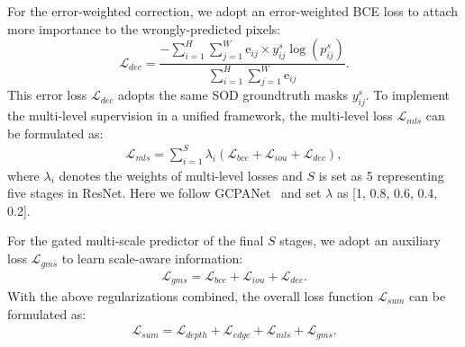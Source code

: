 \documentclass[journal]{IEEEtran}
\newcommand{\mc}[1]{\mathcal{#1}}
\newcommand{\br}[1]{\bm{\mathrm{#1}}}
\begin{document}
For the error-weighted correction, we adopt an error-weighted BCE loss to attach more importance to the wrongly-predicted pixels:
\begin{equation} \label{eq:wbce}
\mc{L}_{dec} = \frac{-\sum_{i=1}^{H}\sum_{j=1}^{W}\br{e}_{ij}\times y^s_{ij}\log(p^s_{ij})}{\sum_{i=1}^{H}\sum_{j=1}^{W}\br{e}_{ij}}.
\end{equation}
This error loss $\mc{L}_{dec}$ adopts the same SOD groundtruth masks $y^s_{ij}$. To implement the multi-level supervision in a unified framework, the multi-level loss $\mc{L}_{mls}$ can be formulated as:
\begin{equation} \label{eq: MLS loss}
\begin{split}
\mc{L}_{mls} = \sum_{i=1}^{S}\lambda_i(\mc{L}_{bce}+\mc{L}_{iou}+\mc{L}_{dec}),
\end{split}
\end{equation}
where $\lambda_i$ denotes the weights of multi-level losses and $S$ is set as 5 representing five stages in ResNet. Here we follow GCPANet~\cite{chen2020global} and set $\lambda$ as [1, 0.8, 0.6, 0.4, 0.2].

For the gated multi-scale predictor of the final $S$ stages, we adopt an auxiliary loss $\mc{L}_{gms}$ to learn scale-aware information:
\begin{equation} \label{eq: GMS loss}
\begin{split}
\mc{L}_{gms} =\mc{L}_{bce}+\mc{L}_{iou}+\mc{L}_{dec}.
\end{split}
\end{equation}
With the above regularizations combined, the overall loss function $\mc{L}_{sum}$ can be formulated as:
\begin{equation} \label{eq:loss}
\begin{split}
\mc{L}_{sum} = \mc{L}_{depth}+\mc{L}_{edge}+\mc{L}_{mls}+\mc{L}_{gms}.
\end{split}
\end{equation}
\end{document}
